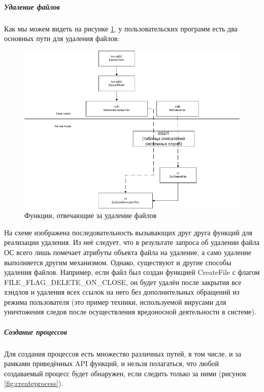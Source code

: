 \subparagraph {Удаление файлов}
Как мы можем видеть на рисунке \ref{fig:filedelete}, у пользовательских программ есть два основных пути
для удаления файлов:
\begin {figure}[h]
	\centering
	\includegraphics[width=\linewidth]{img/DeleteFileAPIs.png}
	\caption{Функции, отвечающие за удаление файлов}
	\label{fig:filedelete}
\end {figure}
На схеме изображена последовательность вызывающих друг друга функций для реализации удаления. Из неё следует, что в результате запроса об удалении файла ОС всего лишь помечает атрибуты объекта файла на удаление, а само удаление выполняется другим механизмом. Однако, существуют и другие способы удаления файлов. Например, если файл был создан функцией CreateFile с флагом FILE\_FLAG\_DELETE\_ON\_CLOSE, он будет удалён после закрытия все хэндлов и удаления всех ссылок на него без дополнительных обращений из режима пользователя (это пример техники, используемой вирусами для уничтожения следов после осуществления вредоносной деятельности в системе).
\subparagraph {Создание процессов}
Для создания процессов есть множество различных путей, в том числе, и за рамками приведённых API функций, и нельзя полагаться, что любой создаваемый процесс будет обнаружен, если следить только за ними (рисунок  \ref{fig:createprocess}).
